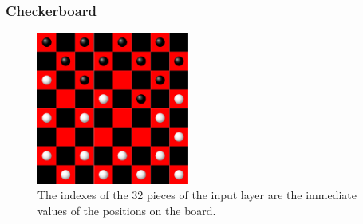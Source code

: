 \documentclass{beamer}
\begin{document}

\begin{frame}
	\frametitle{Checkerboard}
	\begin{figure}[ht!]
		\centering
		\includegraphics[width=50mm]{sampleGame.png}
		\caption{The indexes of the 32 pieces of the input layer are the immediate values of the positions on the board. \label{overflow}}
	\end{figure}
\end{frame}
\end{document}
